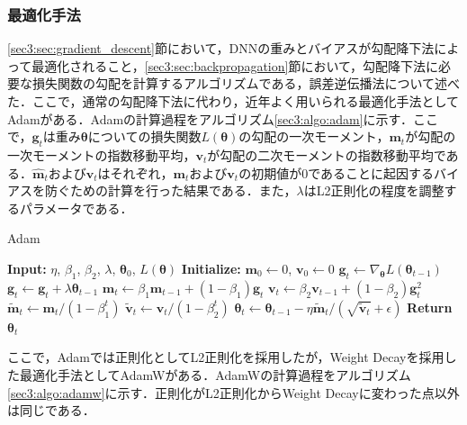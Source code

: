 \documentclass[12pt]{jarticle}
\numberwithin{equation}{section}    %
\numberwithin{figure}{section}      %
\numberwithin{table}{section}      %
\begin{document}
\subsubsection{最適化手法}
\label{sec3:sec:optimizer}
\ref{sec3:sec:gradient_descent}節において，DNNの重みとバイアスが勾配降下法によって最適化されること，\ref{sec3:sec:backpropagation}節において，勾配降下法に必要な損失関数の勾配を計算するアルゴリズムである，誤差逆伝播法について述べた．ここで，通常の勾配降下法に代わり，近年よく用いられる最適化手法としてAdam\cite{kingma2014adam}がある．Adamの計算過程をアルゴリズム\ref{sec3:algo:adam}に示す．ここで，$\bm{g}_{t}$は重み$\bm{\theta}$についての損失関数$L(\bm{\theta})$の勾配の一次モーメント，$\bm{m}_{t}$が勾配の一次モーメントの指数移動平均，$\bm{v}_{t}$が勾配の二次モーメントの指数移動平均である．$\hat{\bm{m}}_{t}$および$\hat{\bm{v}}_{t}$はそれぞれ，$\bm{m}_{t}$および$\bm{v}_{t}$の初期値が0であることに起因するバイアスを防ぐための計算を行った結果である．また，$\lambda$はL2正則化の程度を調整するパラメータである．
\begin{algorithm}
    \caption{Adam}
    \label{sec3:algo:adam}
    \begin{algorithmic}[1]
        \State \textbf{Input:} $\eta$, $\beta_{1}$, $\beta_{2}$, $\lambda$, $\bm{\theta}_{0}$, $L(\bm{\theta})$
        \State \textbf{Initialize:} $\bm{m}_{0} \gets 0$, $\bm{v}_{0} \gets 0$
        \State $\bm{g}_{t} \gets \nabla_{\bm{\theta}} L(\bm{\theta}_{t-1})$
        \State $\bm{g}_t \gets \bm{g}_t + \lambda \bm{\theta}_{t-1}$
        \State $\bm{m}_{t} \gets \beta_{1} \bm{m}_{t-1} + (1 - \beta_{1}) \bm{g}_{t}$
        \State $\bm{v}_{t} \gets \beta_{2} \bm{v}_{t-1} + (1 - \beta_{2}) \bm{g}_{t}^{2}$
        \State $\tilde{\bm{m}}_{t} \gets \bm{m}_{t} / (1 - \beta_{1}^{t})$
        \State $\tilde{\bm{v}}_{t} \gets \bm{v}_{t} / (1 - \beta_{2}^{t})$
        \State $\bm{\theta}_{t} \gets \bm{\theta}_{t-1} - \eta \tilde{\bm{m}}_{t} / (\sqrt{\tilde{\bm{v}}_{t}} + \epsilon)$
        \EndFor
        \State \textbf{Return} $\bm{\theta}_{t}$
    \end{algorithmic}
\end{algorithm}
ここで，Adamでは正則化としてL2正則化を採用したが，Weight Decayを採用した最適化手法としてAdamW\cite{loshchilov2017decoupled}がある．AdamWの計算過程をアルゴリズム\ref{sec3:algo:adamw}に示す．正則化がL2正則化からWeight Decayに変わった点以外は同じである．
\end{document}
